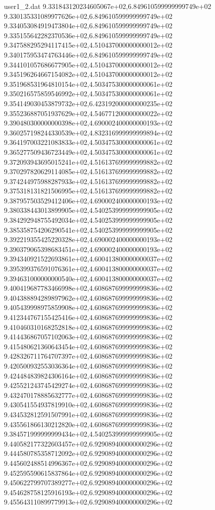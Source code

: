 \begin{filecontents}{user1_2.dat}
9.331843120234605067e+02,6.849610599999999749e+02
9.330135331089977626e+02,6.849610599999999749e+02
9.334053084919473804e+02,6.849610599999999749e+02
9.335155642282370536e+02,6.849610599999999749e+02
9.347588295294117415e+02,4.510437000000000012e+02
9.340175953474763446e+02,6.849610599999999749e+02
9.344101057686677905e+02,4.510437000000000012e+02
9.345196264667154082e+02,4.510437000000000012e+02
9.351968531964810154e+02,4.503475300000000061e+02
9.350216575859546992e+02,4.503475300000000061e+02
9.354149030453879732e+02,6.423192000000000235e+02
9.355236887051937629e+02,4.546771200000000022e+02
9.390480300000000398e+02,4.690002400000000193e+02
9.360257198244330539e+02,4.832316999999999894e+02
9.364197003221083833e+02,4.503475300000000061e+02
9.365277509436723449e+02,4.503475300000000061e+02
9.372093943695015241e+02,4.516137699999999882e+02
9.370297820629114085e+02,4.516137699999999882e+02
9.374244975988287933e+02,4.516137699999999882e+02
9.375318131821506995e+02,4.516137699999999882e+02
9.387957503529412406e+02,4.690002400000000193e+02
9.380338443013899905e+02,4.540253999999999905e+02
9.384292948755492034e+02,4.540253999999999905e+02
9.385358754206290541e+02,4.540253999999999905e+02
9.392219355425220328e+02,4.690002400000000193e+02
9.390379065398683451e+02,4.690002400000000193e+02
9.394340921522693861e+02,4.600413800000000037e+02
9.395399376591076361e+02,4.600413800000000037e+02
9.394631000000000540e+02,4.600413800000000037e+02
9.400419687783466998e+02,4.608687699999999836e+02
9.404388894289897962e+02,4.608687699999999836e+02
9.405439998975859908e+02,4.608687699999999836e+02
9.412344767155425416e+02,4.608687699999999836e+02
9.410460310168252818e+02,4.608687699999999836e+02
9.414436867057102063e+02,4.608687699999999836e+02
9.415480621360643454e+02,4.608687699999999836e+02
9.428326711764707397e+02,4.608687699999999836e+02
9.420500932553036364e+02,4.608687699999999836e+02
9.424484839824306164e+02,4.608687699999999836e+02
9.425521243745429274e+02,4.608687699999999836e+02
9.432470178885632777e+02,4.608687699999999836e+02
9.430541554937819910e+02,4.608687699999999836e+02
9.434532812591507991e+02,4.608687699999999836e+02
9.435561866130212820e+02,4.608687699999999836e+02
9.384571999999999434e+02,4.540253999999999905e+02
9.440582177322603457e+02,6.929089400000000296e+02
9.444580785358712092e+02,6.929089400000000296e+02
9.445602488514996367e+02,6.929089400000000296e+02
9.452595590615837864e+02,6.929089400000000296e+02
9.450622799707389277e+02,6.929089400000000296e+02
9.454628758125916193e+02,6.929089400000000296e+02
9.455643110899779913e+02,6.929089400000000296e+02

\end{filecontents}
